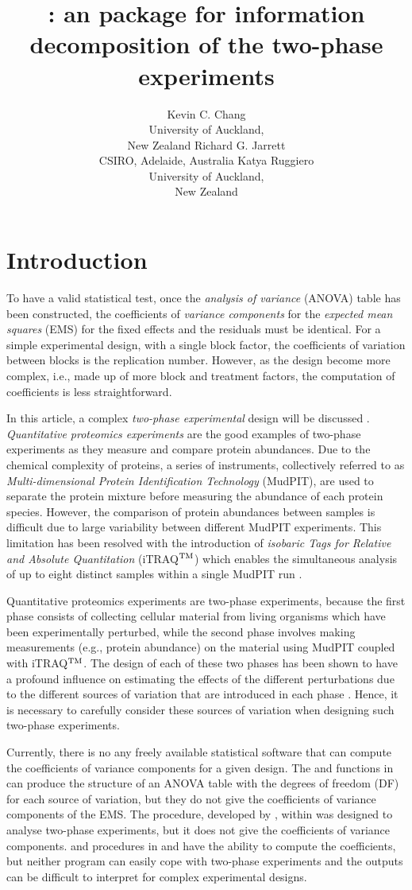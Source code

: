 \documentclass[article]{jss}
\author{Kevin C. Chang\\University of Auckland,\\ New Zealand \And
        Richard G. Jarrett\\CSIRO, Adelaide, Australia \And
        Katya Ruggiero\\University of Auckland,\\ New Zealand }
\title{\pkg{InfoDecompuTE}: an \proglang{R} package for information decomposition of the two-phase experiments}
\begin{document}
\section[Introduction]{Introduction}
To have a valid statistical test, once the \emph{analysis of variance} (ANOVA) table has been constructed, the coefficients of \emph{variance components} for the \emph{expected mean squares} (EMS) for the fixed effects and the residuals must be identical. For a simple experimental design, with a single block factor, the coefficients of variation between blocks is the replication number. However, as the design become more complex, i.e., made up of more block and treatment factors, the computation of coefficients is less straightforward.

In this article, a complex \emph{two-phase experimental} design will be discussed \citep{McIntyre1955}. \emph{Quantitative proteomics experiments} are the good examples of two-phase experiments as they measure and compare protein abundances. Due to the chemical complexity of proteins, a series of instruments, collectively referred to as \emph{Multi-dimensional Protein Identification Technology} (MudPIT), are used to separate the protein mixture before measuring the abundance of each protein species. However, the comparison of protein abundances between samples is difficult due to large variability between different MudPIT experiments. This limitation has been resolved with the introduction of \emph{isobaric Tags for Relative and Absolute Quantitation} (iTRAQ$^{\rm TM}$) which enables the simultaneous analysis of up to eight distinct samples within a single MudPIT run \citep{Ross2004, Choe2007}.

Quantitative proteomics experiments are two-phase experiments, because the first phase consists of collecting cellular material from living organisms which have been experimentally perturbed, while the second phase involves making measurements (e.g., protein abundance) on the material using MudPIT coupled with iTRAQ$^{\rm TM}$. The design of each of these two phases has been shown to have a profound influence on estimating the effects of the different perturbations due to the different sources of variation that are introduced in each phase \citep{Jarrett2008}. Hence, it is necessary to carefully consider these sources of variation when designing such two-phase experiments.

Currently, there is no any freely available statistical software that can compute the coefficients of variance components for a given design. The  and  functions in  can produce the structure of an ANOVA table with the degrees of freedom (DF) for each source of variation, but they do not give the coefficients of variance components of the EMS. The  procedure, developed by \cite{Brien2006}, within  was designed to analyse two-phase experiments, but it does not give the coefficients of variance components.  and  procedures in  and  have the ability to compute the coefficients, but neither program can easily cope with two-phase experiments and the outputs can be difficult to interpret for complex experimental designs.
\end{document}
